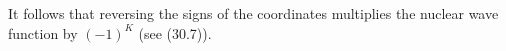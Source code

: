 It follows that reversing the signs of the coordinates multiplies the nuclear wave function by $(-1)^K$ (see (30.7)).
